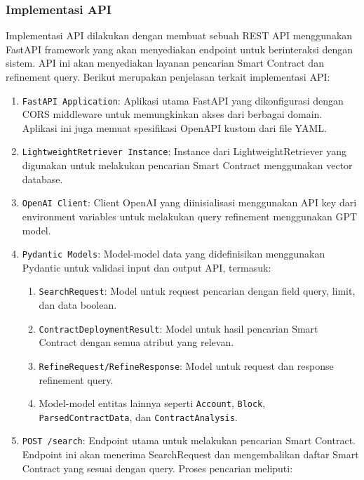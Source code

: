 \subsubsection{Implementasi API}

Implementasi API dilakukan dengan membuat sebuah REST API menggunakan FastAPI framework yang akan menyediakan endpoint untuk berinteraksi dengan sistem. API ini akan menyediakan layanan pencarian Smart Contract dan refinement query. Berikut merupakan penjelasan terkait implementasi API:

\begin{enumerate}
	\item \texttt{FastAPI Application}: Aplikasi utama FastAPI yang dikonfigurasi dengan CORS middleware untuk memungkinkan akses dari berbagai domain. Aplikasi ini juga memuat spesifikasi OpenAPI kustom dari file YAML.
	\item \texttt{LightweightRetriever Instance}: Instance dari LightweightRetriever yang digunakan untuk melakukan pencarian Smart Contract menggunakan vector database.
	\item \texttt{OpenAI Client}: Client OpenAI yang diinisialisasi menggunakan API key dari environment variables untuk melakukan query refinement menggunakan GPT model.
	\item \texttt{Pydantic Models}: Model-model data yang didefinisikan menggunakan Pydantic untuk validasi input dan output API, termasuk:
	      \begin{enumerate}
		      \item \texttt{SearchRequest}: Model untuk request pencarian dengan field query, limit, dan data boolean.
		      \item \texttt{ContractDeploymentResult}: Model untuk hasil pencarian Smart Contract dengan semua atribut yang relevan.
		      \item \texttt{RefineRequest/RefineResponse}: Model untuk request dan response refinement query.
		      \item Model-model entitas lainnya seperti \texttt{Account}, \texttt{Block}, \\\texttt{ParsedContractData}, dan \texttt{ContractAnalysis}.
	      \end{enumerate}
	\item \texttt{POST /search}: Endpoint utama untuk melakukan pencarian Smart Contract. Endpoint ini akan menerima SearchRequest dan mengembalikan daftar Smart Contract yang sesuai dengan query. Proses pencarian meliputi:
	      \begin{enumerate}

\end{enumerate}
\end{enumerate}

